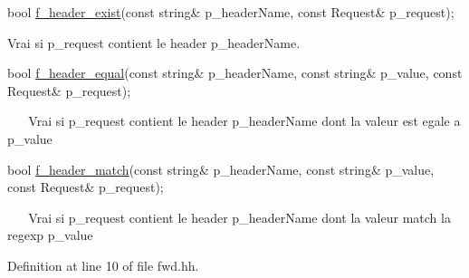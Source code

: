 \begin{DoxyItemize}
\item 
\begin{DoxyCode}
\textcolor{keywordtype}{bool} \hyperlink{classxtd_1_1network_1_1http_1_1Server_a7f7478d5e4c12fed3743b42f7d118398}{f\_header\_exist}(\textcolor{keyword}{const} \textcolor{keywordtype}{string}& p\_headerName, \textcolor{keyword}{const} Request& p\_request); 
\end{DoxyCode}
 Vrai si p\+\_\+request contient le header p\+\_\+header\+Name. ~\newline
~\newline
 ~\newline
~\newline

\item 
\begin{DoxyCode}
\textcolor{keywordtype}{bool} \hyperlink{classxtd_1_1network_1_1http_1_1Server_a68192c550d0c9aa2d3341c3b7acbbb55}{f\_header\_equal}(\textcolor{keyword}{const} \textcolor{keywordtype}{string}& p\_headerName, \textcolor{keyword}{const} \textcolor{keywordtype}{string}& p\_value, \textcolor{keyword}{const} Request& 
      p\_request); 
\end{DoxyCode}
 ~\newline
~\newline
 Vrai si p\+\_\+request contient le header p\+\_\+header\+Name dont la valeur est egale a p\+\_\+value ~\newline
~\newline

\item 
\begin{DoxyCode}
\textcolor{keywordtype}{bool} \hyperlink{classxtd_1_1network_1_1http_1_1Server_a015a4e5a2f93dc0df58e4c28af2e5e31}{f\_header\_match}(\textcolor{keyword}{const} \textcolor{keywordtype}{string}& p\_headerName, \textcolor{keyword}{const} \textcolor{keywordtype}{string}& p\_value, \textcolor{keyword}{const} Request& 
      p\_request); 
\end{DoxyCode}
 ~\newline
~\newline
 Vrai si p\+\_\+request contient le header p\+\_\+header\+Name dont la valeur match la regexp p\+\_\+value ~\newline
~\newline
 
\end{DoxyItemize}

Definition at line 10 of file fwd.\+hh.



